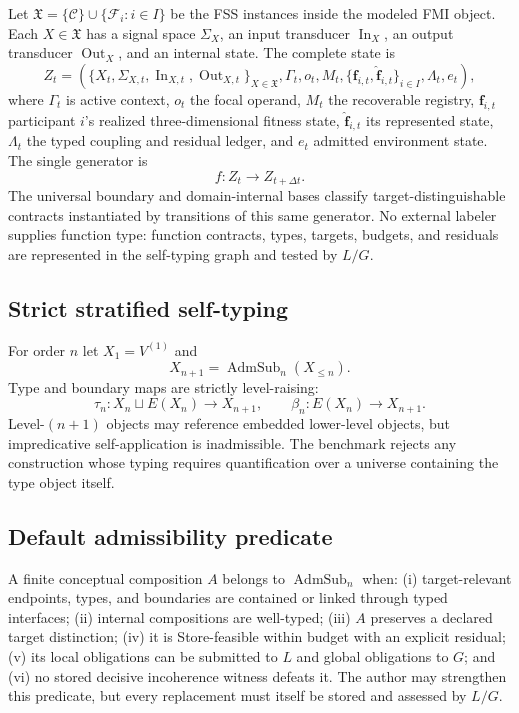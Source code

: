 \documentclass[11pt]{article}
\newcommand{\C}{\mathcal{C}}
\newcommand{\F}{\mathcal{F}}
\newcommand{\AdmSub}{\operatorname{AdmSub}}
\newcommand{\Sig}{\Sigma}
\newcommand{\InOp}{\operatorname{In}}
\newcommand{\OutOp}{\operatorname{Out}}
\begin{document}
Let $\mathfrak X=\{\C\}\cup\{\F_i:i\in I\}$ be the FSS instances inside the modeled FMI object. Each $X\in\mathfrak X$ has a signal space $\Sig_X$, an input transducer $\InOp_X$, an output transducer $\OutOp_X$, and an internal state. The complete state is
\begin{equation}
Z_t=\left(
\{X_t,\Sig_{X,t},\InOp_{X,t},\OutOp_{X,t}\}_{X\in\mathfrak X},
\Gamma_t,o_t,M_t,
\{\mathbf f_{i,t},\widehat{\mathbf f}_{i,t}\}_{i\in I},
\Lambda_t,e_t
\right),
\end{equation}
where $\Gamma_t$ is active context, $o_t$ the focal operand, $M_t$ the recoverable registry, $\mathbf f_{i,t}$ participant $i$'s realized three-dimensional fitness state, $\widehat{\mathbf f}_{i,t}$ its represented state, $\Lambda_t$ the typed coupling and residual ledger, and $e_t$ admitted environment state. The single generator is
\begin{equation}
\boxed{f:Z_t\rightarrow Z_{t+\Delta t}.}
\end{equation}
The universal boundary and domain-internal bases classify target-distinguishable contracts instantiated by transitions of this same generator. No external labeler supplies function type: function contracts, types, targets, budgets, and residuals are represented in the self-typing graph and tested by $L/G$.

\subsection{Strict stratified self-typing}

For order $n$ let $X_1=V^{(1)}$ and
\begin{equation}
X_{n+1}=\AdmSub_n(X_{\le n}).
\end{equation}
Type and boundary maps are strictly level-raising:
\begin{equation}
\tau_n:X_n\sqcup E(X_n)\rightarrow X_{n+1},\qquad
\beta_n:E(X_n)\rightarrow X_{n+1}.
\end{equation}
Level-$(n+1)$ objects may reference embedded lower-level objects, but impredicative self-application is inadmissible. The benchmark rejects any construction whose typing requires quantification over a universe containing the type object itself.

\subsection{Default admissibility predicate}

A finite conceptual composition $A$ belongs to $\AdmSub_n$ when: (i) target-relevant endpoints, types, and boundaries are contained or linked through typed interfaces; (ii) internal compositions are well-typed; (iii) $A$ preserves a declared target distinction; (iv) it is Store-feasible within budget with an explicit residual; (v) its local obligations can be submitted to $L$ and global obligations to $G$; and (vi) no stored decisive incoherence witness defeats it. The author may strengthen this predicate, but every replacement must itself be stored and assessed by $L/G$.
\end{document}
